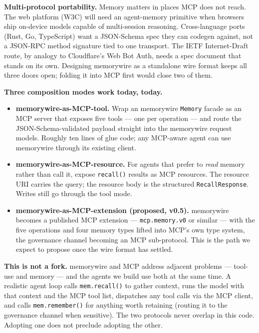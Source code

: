 \documentclass[11pt,letterpaper,twocolumn]{article}
\begin{document}
\textbf{Multi-protocol portability.} Memory matters in places MCP does not reach. The web platform (W3C) will need an agent-memory primitive when browsers ship on-device models capable of multi-session reasoning. Cross-language ports (Rust, Go, TypeScript) want a JSON-Schema spec they can codegen against, not a JSON-RPC method signature tied to one transport. The IETF Internet-Draft route, by analogy to Cloudflare's Web Bot Auth, needs a spec document that stands on its own. Designing memorywire as a standalone wire format keeps all three doors open; folding it into MCP first would close two of them.

\textbf{Three composition modes work today, today.}

\begin{itemize}[leftmargin=*]
  \item \textbf{memorywire-as-MCP-tool.} Wrap an memorywire \texttt{Memory} facade as an MCP server that exposes five tools --- one per operation --- and route the JSON-Schema-validated payload straight into the memorywire request models. Roughly ten lines of glue code; any MCP-aware agent can use memorywire through its existing client.
  \item \textbf{memorywire-as-MCP-resource.} For agents that prefer to \emph{read} memory rather than call it, expose \texttt{recall()} results as MCP resources. The resource URI carries the query; the resource body is the structured \texttt{RecallResponse}. Writes still go through the tool mode.
  \item \textbf{memorywire-as-MCP-extension (proposed, v0.5).} memorywire becomes a published MCP extension --- \texttt{mcp.memory.v0} or similar --- with the five operations and four memory types lifted into MCP's own type system, the governance channel becoming an MCP sub-protocol. This is the path we expect to propose once the wire format has settled.
\end{itemize}

\textbf{This is not a fork.} memorywire and MCP address adjacent problems --- tool-use and memory --- and the agents we build use both at the same time. A realistic agent loop calls \texttt{mem.recall()} to gather context, runs the model with that context and the MCP tool list, dispatches any tool calls via the MCP client, and calls \texttt{mem.remember()} for anything worth retaining (routing it to the governance channel when sensitive). The two protocols never overlap in this code. Adopting one does not preclude adopting the other.
\end{document}
